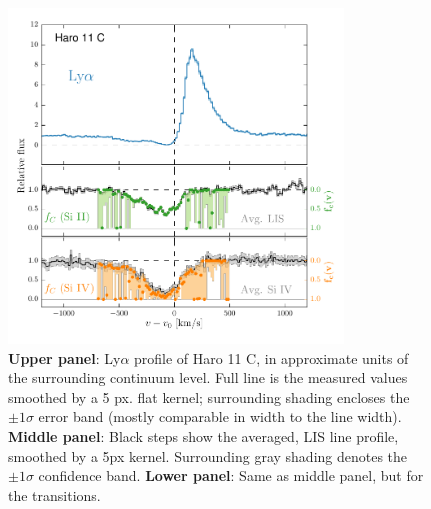 \documentclass[twocolumn]{aastex61}
\begin{document}
\begin{figure}
\centering
\includegraphics[width=3.500in]{../Figs/LyACoverfracs.pdf}
\caption{\textbf{Upper panel}: Ly$\alpha$ profile of Haro 11 C, in
approximate units of the surrounding continuum level. Full line is the
measured values smoothed by a 5 px. flat kernel; surrounding shading
encloses the $\pm 1 \sigma$ error band (mostly comparable in width to
the line width). \textbf{Middle panel}: Black steps show the averaged,
LIS line profile, smoothed by a 5px kernel. Surrounding gray shading
denotes the $\pm 1 \sigma$ confidence band. \textbf{Lower panel}: Same
as middle panel, but for the  transitions.
}\label{fig:HisLisLya}
\end{figure}
\end{document}

